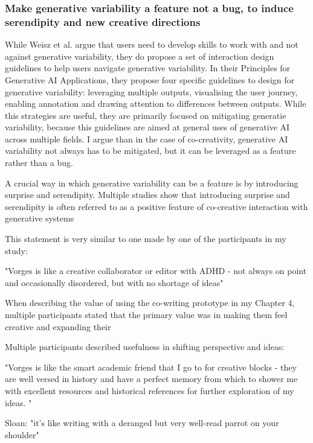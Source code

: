 \subsubsection{Make generative variability a feature not a bug, to induce serendipity and new creative directions}

While Weisz et al. \cite{Weisz2024-io} argue that users need to develop skills to work with and not against generative variability, they do propose a set of interaction design guidelines to help users navigate generative variability. In their Principles for Generative AI Applications, they propose four specific guidelines to design for generative variability: leveraging multiple outputs, visualising the user journey, enabling annotation and drawing attention to differences between outputs. While this strategies are useful, they are primarily focused on mitigating generatie variability, because this guidelines are aimed at general uses of generative AI across multiple fields. I argue than in the case of co-creativity, generative AI variability not always has to be mitigated, but it can be leveraged as a feature rather than a bug. 

A crucial way in which generative variability can be a feature is by introducing surprise and serendipity. Multiple studies show that introducing surprise and serendipity is often referred to as a positive feature of co-creative interaction with generative systems \cite{Lawton2023-tb, Chiou2023-vr, Louie2020-aq, Moruzzi2022-gp, Park2024-gw, Koch2020-gx}


This statement is very similar to one made by one of the participants in my study: 

"Vorges is like a creative collaborator or editor with ADHD - not always on point and occasionally disordered, but with no shortage of ideas"

When describing the value of using the co-writing prototype in my Chapter 4, multiple participants stated that the primary value was in making them feel creative and expanding their 

Multiple participants described usefulness in shifting perspective and ideas:

"Vorges is like the smart academic friend that I go to for creative blocks - they are well versed in history and have a perfect memory from which to shower me with excellent resources and historical references for further exploration of my ideas. "

Sloan: "it’s like writing with a deranged but very well-read parrot on your shoulder"

